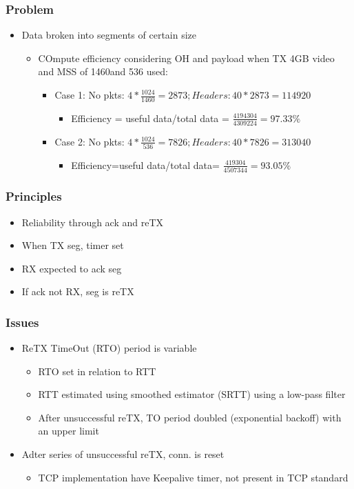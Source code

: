 \documentclass[a4paper]{article}
\begin{document}
\subsubsection{Problem}
\begin{itemize}
	\item Data broken into segments of certain size
	\begin{itemize}
		\item COmpute efficiency considering OH and payload when TX 4GB
			video and MSS of 1460and 536 used:
		\begin{itemize}
			\item Case 1: No pkts: $4*\frac{1024}{1460}=2873;
				Headers: 40*2873=114920$
			\begin{itemize}
				\item Efficiency = useful data/total data =
					$\frac{4194304}{4309224}=97.33\%$
			\end{itemize}
			\item Case 2: No pkts: $4*\frac{1024}{536}=7826;
				Headers: 40*7826=313040$
			\begin{itemize}
				\item Efficiency=useful data/total data=
					$\frac{419304}{4507344}=93.05\% $
			\end{itemize}
		\end{itemize}
	\end{itemize}
\end{itemize}
\subsubsection{Principles}
\begin{itemize}
	\item Reliability through ack and reTX
	\item When TX seg, timer set
	\item RX expected to ack seg
	\item If ack not RX, seg is reTX
\end{itemize}
\subsubsection{Issues}
\begin{itemize}
	\item ReTX TimeOut (RTO) period is variable
	\begin{itemize}
		\item RTO set in relation to RTT
		\item RTT estimated using smoothed estimator (SRTT) using a
			low-pass filter
		\item After unsuccessful reTX, TO period doubled (exponential
			backoff) with an upper limit
	\end{itemize}
	\item Adter series of unsuccessful reTX, conn. is reset
	\begin{itemize}
		\item TCP implementation have Keepalive timer, not present in
			TCP standard
	\end{itemize}
\end{itemize}
\end{document}
